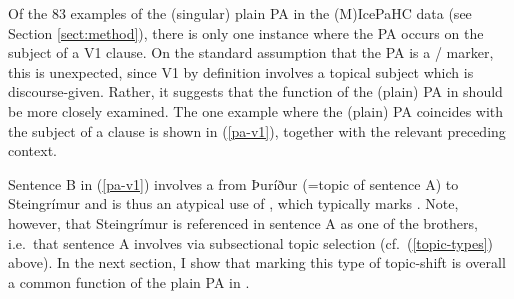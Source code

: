 \documentclass[output=paper,colorlinks,citecolor=brown]{langscibook}
\begin{document}
\z
\z

Of the 83 examples of the (singular) plain PA in the (M)IcePaHC data (see Section \ref{sect:method}), there is only one instance where the PA occurs on the subject of a  V1 clause. On the standard assumption that the PA is a / marker, this is unexpected, since  V1 by definition involves a topical subject which is discourse-given. Rather, it suggests that the function of the (plain) PA in  should be more closely examined. The one example where the (plain) PA coincides with the subject of a  clause is shown in (\ref{pa-v1}), together with the relevant preceding context. 

\ea \label{pa-v1} 
\z 
\z 

Sentence B in (\ref{pa-v1}) involves a  from Þuríður (=topic of sentence A) to Steingrímur and is thus an atypical use of , which typically marks . Note, however, that Steingrímur is referenced in sentence A as one of the brothers, i.e.~that sentence A involves  via subsectional topic selection (cf.~(\ref{topic-types}) above). In the next section, I show that marking this type of topic-shift is overall a common function of the plain PA in . 
\end{document}
